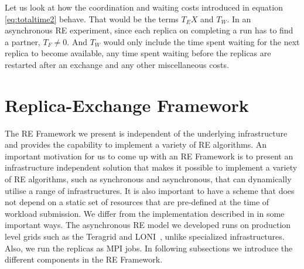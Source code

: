 \documentclass{rspublic}
\newcommand{\jhanote}[1]{ {\textcolor{red} { ***shantenu: #1 }}}
\newcommand{\alnote}[1]{ {\textcolor{blue} { ***andre: #1 }}}
\newcommand{\athotanote}[1]{ {\textcolor{green} { ***athota: #1 }}}
\newcommand{\alnote}[1]{}
\newcommand{\athotanote}[1]{}
\newcommand{\jhanote}[1]{}
\begin{document}
Let us look at how the coordination and waiting costs introduced in equation \ref{eq:totaltime2} behave. That would be the terms $T_EX$ and $T_W$. In an asynchronous RE experiment, since each replica on completing a run has to find a partner, $T_F \neq 0$. And $T_W$ would only include the time spent waiting for the next replica to become available, any time spent waiting before the replicas are restarted after an exchange and any other miscellaneous costs.




\section{Replica-Exchange Framework}

The RE Framework we present is independent of the underlying infrastructure and provides the capability to implement a variety of RE algorithms. 
An important motivation for us to come up with an RE Framework is to present an infrastructure independent solution that makes it possible to implement a variety of RE algorithms, such as synchronous and asynchronous, that can dynamically utilise a range of infrastructures.
 It is also important to have a scheme
that does not depend on a static set of resources that are pre-defined
at the time of workload submission.  
   We differ from the implementation described
in \citep{parashar_arepex} in some important ways.  The asynchronous
RE model we developed runs on production level grids such as the
Teragrid and LONI~\citep{LONI_web}, unlike specialized
infrastructures. %
Also, we run the replicas as MPI jobs. In following subsections we introduce the different components in the RE Framework. 
  
\end{document}
